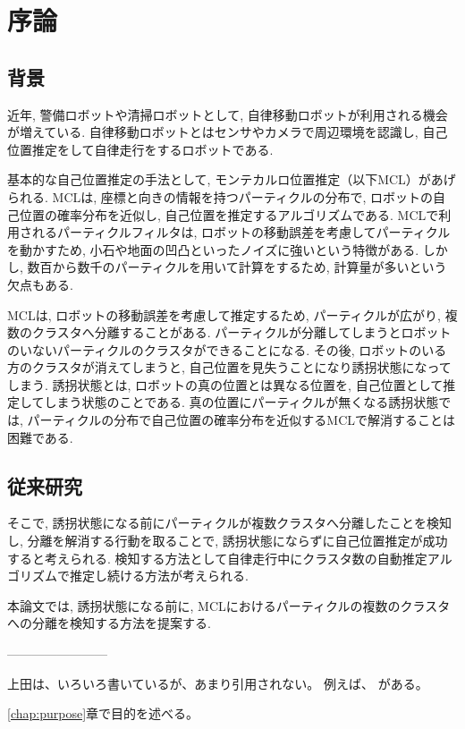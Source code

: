 \chapter{序論}
\section{背景}
近年, 警備ロボットや清掃ロボットとして, 自律移動ロボットが利用される機会が増えている. 
自律移動ロボットとはセンサやカメラで周辺環境を認識し, 自己位置推定をして自律走行をするロボットである. 

基本的な自己位置推定の手法として, モンテカルロ位置推定（以下MCL）があげられる. 
MCLは, 座標と向きの情報を持つパーティクルの分布で, ロボットの自己位置の確率分布を近似し, 自己位置を推定するアルゴリズムである.
MCLで利用されるパーティクルフィルタは, ロボットの移動誤差を考慮してパーティクルを動かすため, 小石や地面の凹凸といったノイズに強いという特徴がある. 
しかし, 数百から数千のパーティクルを用いて計算をするため, 計算量が多いという欠点もある.

MCLは, ロボットの移動誤差を考慮して推定するため, パーティクルが広がり, 複数のクラスタへ分離することがある. 
パーティクルが分離してしまうとロボットのいないパーティクルのクラスタができることになる. 
その後, ロボットのいる方のクラスタが消えてしまうと, 自己位置を見失うことになり誘拐状態になってしまう. 
誘拐状態とは, ロボットの真の位置とは異なる位置を, 自己位置として推定してしまう状態のことである.
真の位置にパーティクルが無くなる誘拐状態では, パーティクルの分布で自己位置の確率分布を近似するMCLで解消することは困難である. 


\section{従来研究}


そこで, 誘拐状態になる前にパーティクルが複数クラスタへ分離したことを検知し, 分離を解消する行動を取ることで, 誘拐状態にならずに自己位置推定が成功すると考えられる. 
検知する方法として自律走行中にクラスタ数の自動推定アルゴリズムで推定し続ける方法が考えられる. 

本論文では, 誘拐状態になる前に, MCLにおけるパーティクルの複数のクラスタへの分離を検知する方法を提案する. 









------------------------


上田は、いろいろ書いているが、あまり引用されない。
例えば、\cite{上田2015gihyo,ueda2015,上田2015jsai}
がある。

\ref{chap:purpose}章で目的を述べる。

%
